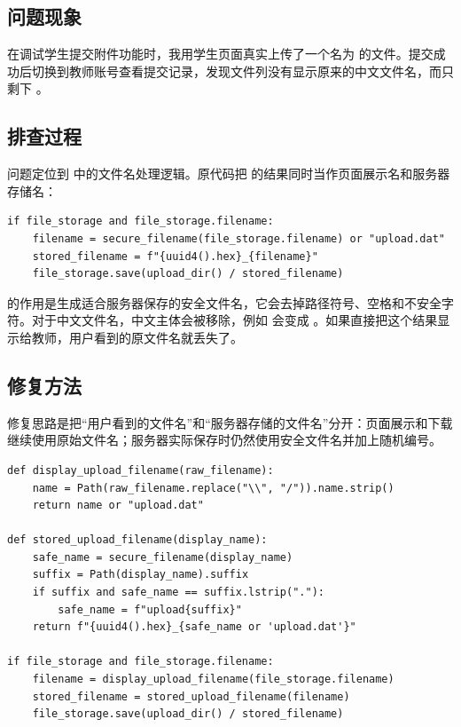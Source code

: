 \documentclass[UTF8,12pt]{ctexart}
\begin{document}
\subsection{问题现象}

在调试学生提交附件功能时，我用学生页面真实上传了一个名为  的文件。提交成功后切换到教师账号查看提交记录，发现文件列没有显示原来的中文文件名，而只剩下 。


\subsection{排查过程}

问题定位到  中的文件名处理逻辑。原代码把  的结果同时当作页面展示名和服务器存储名：

\begin{verbatim}
if file_storage and file_storage.filename:
    filename = secure_filename(file_storage.filename) or "upload.dat"
    stored_filename = f"{uuid4().hex}_{filename}"
    file_storage.save(upload_dir() / stored_filename)
\end{verbatim}

 的作用是生成适合服务器保存的安全文件名，它会去掉路径符号、空格和不安全字符。对于中文文件名，中文主体会被移除，例如  会变成 。如果直接把这个结果显示给教师，用户看到的原文件名就丢失了。

\subsection{修复方法}

修复思路是把“用户看到的文件名”和“服务器存储的文件名”分开：页面展示和下载继续使用原始文件名；服务器实际保存时仍然使用安全文件名并加上随机编号。

\begin{verbatim}
def display_upload_filename(raw_filename):
    name = Path(raw_filename.replace("\\", "/")).name.strip()
    return name or "upload.dat"

def stored_upload_filename(display_name):
    safe_name = secure_filename(display_name)
    suffix = Path(display_name).suffix
    if suffix and safe_name == suffix.lstrip("."):
        safe_name = f"upload{suffix}"
    return f"{uuid4().hex}_{safe_name or 'upload.dat'}"

if file_storage and file_storage.filename:
    filename = display_upload_filename(file_storage.filename)
    stored_filename = stored_upload_filename(filename)
    file_storage.save(upload_dir() / stored_filename)
\end{verbatim}
\end{document}
